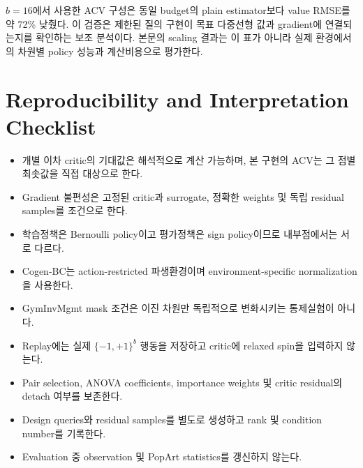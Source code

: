 \documentclass[10pt,journal]{IEEEtran}
\begin{document}
\begin{table}[!t]
\centering
\caption{Synthetic estimator validation. RMSE is averaged over the completed validation records.}
\label{tab:supp-estimator-validation}
\end{table}

$b=16$에서 사용한 ACV 구성은 동일 budget의 plain estimator보다 value RMSE를 약 72\% 낮췄다. 이 검증은 제한된 질의 구현이 목표 다중선형 값과 gradient에 연결되는지를 확인하는 보조 분석이다. 본문의 scaling 결과는 이 표가 아니라 실제 환경에서의 차원별 policy 성능과 계산비용으로 평가한다.

\section{Reproducibility and Interpretation Checklist}
\label{sec:boundaries}

\begin{itemize}
    \item 개별 이차 critic의 기대값은 해석적으로 계산 가능하며, 본 구현의 ACV는 그 점별 최솟값을 직접 대상으로 한다.
    \item Gradient 불편성은 고정된 critic과 surrogate, 정확한 weights 및 독립 residual samples를 조건으로 한다.
    \item 학습정책은 Bernoulli policy이고 평가정책은 sign policy이므로 내부점에서는 서로 다르다.
    \item Cogen-BC는 action-restricted 파생환경이며 environment-specific normalization을 사용한다.
    \item GymInvMgmt mask 조건은 이진 차원만 독립적으로 변화시키는 통제실험이 아니다.
    \item Replay에는 실제 $\{-1,+1\}^b$ 행동을 저장하고 critic에 relaxed spin을 입력하지 않는다.
    \item Pair selection, ANOVA coefficients, importance weights 및 critic residual의 detach 여부를 보존한다.
    \item Design queries와 residual samples를 별도로 생성하고 rank 및 condition number를 기록한다.
    \item Evaluation 중 observation 및 PopArt statistics를 갱신하지 않는다.
\end{itemize}
\end{document}
